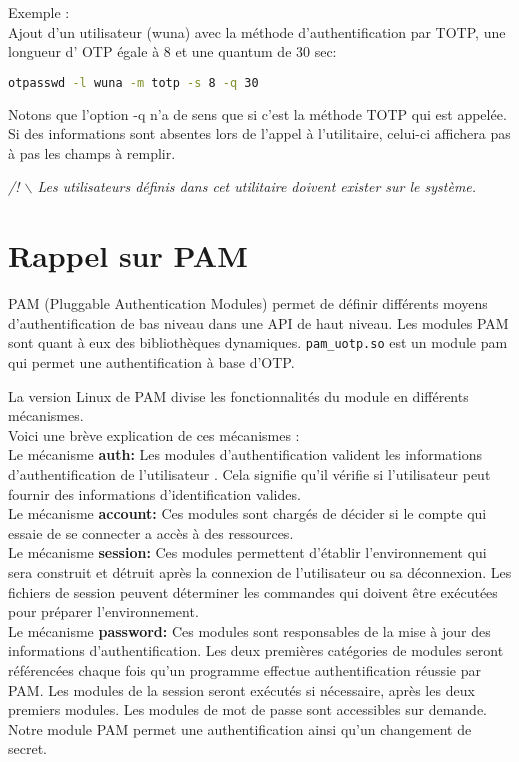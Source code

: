 \documentclass{"../../../res/univ-projet"}
\begin{document}
Exemple :\\
Ajout d'un utilisateur (wuna) avec la méthode d'authentification par TOTP, une longueur d'
OTP égale à 8 et une quantum de 30 sec:
\begin{lstlisting}[language=bash, backgroundcolor=\color{black}, basicstyle=\color{white}]
otpasswd -l wuna -m totp -s 8 -q 30
\end{lstlisting}
Notons que l'option -q n'a de sens que si c'est la méthode TOTP qui est appelée.\\

Si des informations sont absentes lors de l'appel à l'utilitaire, 
celui-ci affichera pas à pas les champs à remplir.

\textit{/! $\backslash$ Les utilisateurs définis dans cet utilitaire 
doivent exister sur le système.}

\section{Rappel sur PAM}
PAM (Pluggable Authentication Modules) permet de définir différents moyens
d'authentification de bas niveau dans une API de haut niveau.
Les modules PAM sont quant à eux des bibliothèques dynamiques. \verb?pam_uotp.so?
est un module pam qui permet une authentification à base d'OTP.

La version Linux de PAM divise les fonctionnalités du module en différents mécanismes.\\
Voici une brève explication de ces mécanismes :\\
Le mécanisme \textbf{auth:} Les modules d'authentification valident les informations d'authentification de l'utilisateur . Cela signifie qu'il vérifie si l'utilisateur peut fournir des informations d'identification valides.\\
Le mécanisme \textbf{account:} Ces modules sont chargés de décider si le compte qui essaie de se connecter a accès à des ressources.\\
Le mécanisme \textbf{session:} Ces modules permettent d'établir l'environnement qui sera construit et détruit après la connexion de l'utilisateur ou sa déconnexion. Les fichiers de session peuvent déterminer les commandes qui doivent être exécutées pour préparer l'environnement.\\
Le mécanisme \textbf{password:} Ces modules sont responsables de la mise à jour des informations d'authentification.
Les deux premières catégories de modules seront référencées chaque fois qu'un programme effectue authentification réussie par PAM. 
Les modules de la session seront exécutés si nécessaire, après les deux premiers modules. Les modules de mot de passe sont accessibles sur demande. Notre module PAM permet une authentification ainsi qu'un changement de secret.
\end{document}
